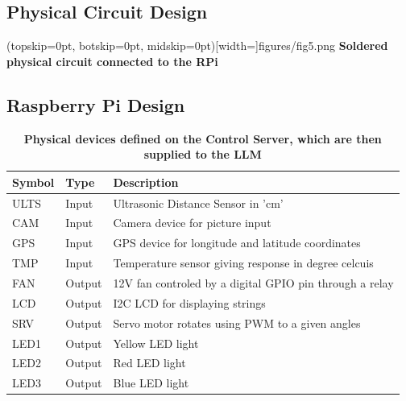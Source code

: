 \documentclass{ieeeaccess}
\begin{document}

\subsection{Physical Circuit Design}

\Figure[t!](topskip=0pt, botskip=0pt,
midskip=0pt)[width=\textwidth]{{figures/fig5.png}}
{ \textbf{Soldered physical circuit connected to the RPi}\label{fig2}}

\subsection{Raspberry Pi Design}
\begin{table}
    \caption{\textbf{Physical devices defined on the Control Server, which are then supplied to the LLM}}
    \label{table1}
    \setlength{\tabcolsep}{3pt}
    \begin{tabular}{|p{30pt}|p{25pt}|p{180pt}|}
        \hline
        \textbf{Symbol} &
        \textbf{Type}   &
        \textbf{Description}                                             \\
        \hline
        ULTS   &
        Input  &
        Ultrasonic Distance Sensor in 'cm'                      \\
        \hline
        CAM    &
        Input  &
        Camera device for picture input                         \\
        \hline
        GPS    &
        Input  &
        GPS device for longitude and latitude coordinates       \\
        \hline
        TMP    &
        Input  &
        Temperature sensor giving response in degree celcuis    \\
        \hline
        FAN    &
        Output &
        12V fan controled by a digital GPIO pin through a relay \\
        \hline
        LCD    &
        Output &
        I2C LCD for displaying strings                          \\
        \hline
        SRV    &
        Output &
        Servo motor rotates using PWM to a given angles         \\
        \hline
        LED1   &
        Output &
        Yellow LED light                                        \\
        \hline
        LED2   &
        Output &
        Red LED light                                           \\
        \hline
        LED3   &
        Output &
        Blue LED light                                          \\
        \hline
    \end{tabular}
\end{table}
\end{document}
